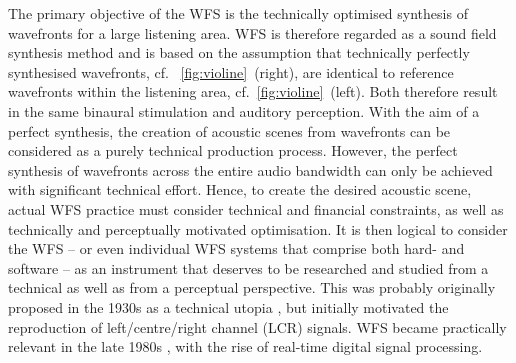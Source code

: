 The primary objective of the WFS is the technically optimised synthesis
of wavefronts for a large listening area.
%
WFS is therefore regarded as a sound field synthesis
method \cite{Spors2013_IEEE}  %
%
and is based on the assumption that technically perfectly synthesised
wavefronts, cf.~ \myfig\ref{fig:violine}~(right), are identical to reference
wavefronts within the listening area, cf.~\myfig\ref{fig:violine}~(left).
Both therefore result in the same binaural stimulation \cite[p.~573]{Snow1953}
and auditory perception.
%
With the aim of a perfect synthesis, the creation of acoustic
scenes from wavefronts can be considered as a purely technical production
process.
%
However, the perfect synthesis of wavefronts across the entire audio bandwidth
can only be achieved with significant technical effort.
%
Hence, to create the desired acoustic scene,
actual WFS practice must consider
technical and financial constraints, as well as
technically and perceptually motivated optimisation.
%
It is then logical to consider the WFS -- or even individual WFS systems that
comprise both hard- and software -- as an instrument that deserves to be
researched and studied from a technical as well as from a perceptual perspective.
%
This was probably originally proposed in the 1930s as a technical utopia
\cite{Fletcher1934,Steinberg1934}, but initially motivated the reproduction
of left/centre/right channel (LCR) signals.
WFS became practically relevant in the late 1980s
\cite{Berkhout1988_JAES}, with the rise of real-time
digital signal processing.



